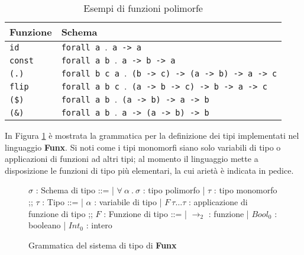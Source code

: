 \begin{table}[H]
    \vspace{4mm}
    \begin{center}
        \begin{tabularx}{\textwidth}{|P{6em}|X|}
            \hline
            \textbf{Funzione} & \textbf{Schema}                                                   \\
            \hline
            \texttt{id}       & \texttt{forall a $\mathord{.}$ a -> a}                             \\
            \hline
            \texttt{const}    & \texttt{forall a b $\mathord{.}$ a -> b -> a}                      \\
            \hline
            \texttt{(.)}      & \texttt{forall b c a $\mathord{.}$ (b -> c) -> (a -> b) -> a -> c} \\
            \hline
            \texttt{flip}     & \texttt{forall a b c $\mathord{.}$ (a -> b -> c) -> b -> a -> c}   \\
            \hline
            \texttt{(\$)}     & \texttt{forall a b $\mathord{.}$ (a -> b) -> a -> b}               \\
            \hline
            \texttt{(\&)}     & \texttt{forall a b $\mathord{.}$ a -> (a -> b) -> b}               \\
            \hline
        \end{tabularx}
    \end{center}
    \caption{Esempi di funzioni polimorfe}
    \label{tab:3-polymorphic-functions}
    \vspace{4mm}
\end{table}

\noindent In Figura \ref{fig:3-system-hm} è mostrata la grammatica per la definizione dei tipi
implementati nel linguaggio \textbf{Funx}. Si noti come i tipi monomorfi siano solo
variabili di tipo o applicazioni di funzioni ad altri tipi; al momento il linguaggio mette a disposizione
le funzioni di tipo più elementari, la cui arietà è indicata in pedice.

\begin{figure}[H]
    \centering
    \vspace{4mm}
    \begin{spacedbnf}
        $\sigma$ : \small{Schema di tipo} ::=
        | $\forall\ \alpha\ \mathord{.}\ \sigma$ : \small{tipo polimorfo}
        | $\tau$ : \small{tipo monomorfo}
        ;;
        $\tau$ : \small{Tipo} ::=
        | $\alpha$ : \small{variabile di tipo}
        | $F\ \tau\ldots\tau$ : \small{applicazione di funzione di tipo}
        ;;
        $F$ : \small{Funzione di tipo} ::=
        | $\rightarrow_2$ : \small{funzione}
        | $Bool_0$ : \small{booleano}
        | $Int_0$ : \small{intero}
    \end{spacedbnf}
    \caption{Grammatica del sistema di tipo di \textbf{Funx}}
    \label{fig:3-system-hm}
    \vspace{4mm}
\end{figure}